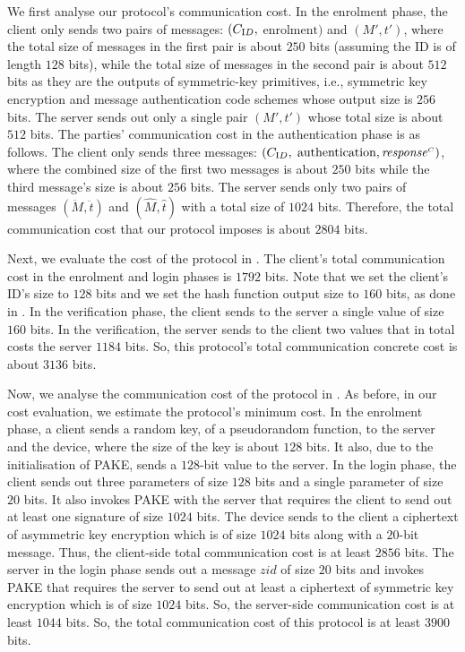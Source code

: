 We first analyse our protocol's communication cost. In the enrolment phase,  the client only sends two pairs of messages: $(C_{\text ID}, $ $\text{enrolment})$ and $(M', t')$, where the total size of messages in the first pair is about $250$ bits (assuming the ID is of length $128$ bits),  while the total size of messages in the second pair is about  $512$ bits as they are the outputs of symmetric-key primitives, i.e., symmetric key encryption and message authentication code schemes whose output size is $256$ bits. The server sends out only a single pair $(M', t')$ whose total size is about $512$ bits. 
% 
The parties' communication cost in the authentication phase is as follows. The client only sends three messages: $(C_{\text ID}, $ $\text{authentication}, \mathit{response}^{\scriptscriptstyle C})$, where the combined size of the first two messages is about $250$ bits while the third message's size is about $256$ bits. The server sends only two pairs of messages $(\ddot M, \ddot t)$ and $(\hat M, \hat t)$ with a total size of $1024$ bits. Therefore, the total communication cost that our protocol imposes is about $2804$ bits. 

Next, we evaluate the cost of the protocol in \cite{WangW18}. The client's total communication cost in the enrolment and login phases is $1792$ bits. Note that we set the client's ID's size to $128$ bits and we set the hash function output size to $160$ bits, as done in \cite{WangW18}. In the verification phase, the client sends to the server a single value of size $160$ bits. In the verification, the server sends to the client two values that in total costs the server $1184$ bits. So, this protocol's total communication concrete cost is about $3136$ bits.%


Now, we analyse the communication cost of the protocol in \cite{JareckiJKSS21}. As before, in our cost evaluation, we estimate the protocol's minimum cost.  In the enrolment phase, a client sends a random key, of a pseudorandom function, to the server and the device, where the size of the key is about $128$ bits. It also, due to the initialisation of PAKE, sends a $128$-bit value to the server. In the login phase, the client sends out three parameters of size $128$ bits and a single parameter of size $20$ bits.  It also invokes PAKE with the server that requires the client to send out at least one signature of size $1024$ bits. The device sends to the client a ciphertext of asymmetric key encryption which is of size $1024$ bits along with a $20$-bit message. Thus, the client-side total communication cost is at least $2856$ bits. The server in the login phase sends out a message $zid$ of size $20$ bits and invokes PAKE that requires the server to send out at least a ciphertext of symmetric key encryption which is of size $1024$ bits.  So, the server-side communication cost is at least $1044$ bits. So, the total communication cost of this protocol is at least $3900$ bits. 





